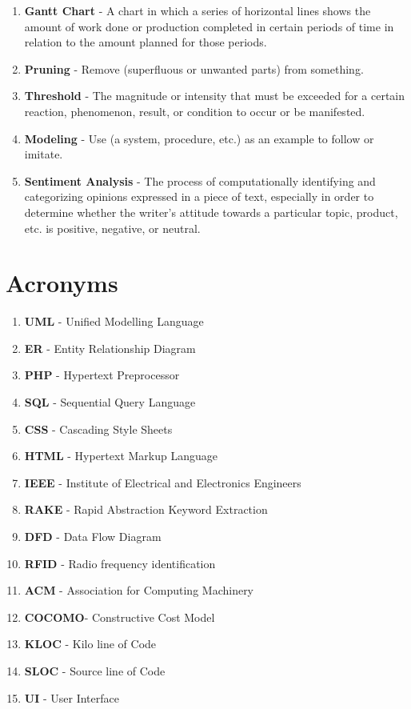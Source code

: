 \documentclass[a4paper,12pt]{report}
\begin{document}
\begin{enumerate}
  \item \textbf{Gantt Chart} - A chart in which a series of horizontal lines shows the amount of work done or production completed in certain periods of time in relation to the amount planned for those periods.
  \item \textbf{Pruning} - Remove (superfluous or unwanted parts) from something.
  \item \textbf{Threshold} - The magnitude or intensity that must be exceeded for a certain reaction, phenomenon, result, or condition to occur or be manifested.
  \item \textbf{Modeling} - Use (a system, procedure, etc.) as an example to follow or imitate.
  \item \textbf{Sentiment Analysis} - The process of computationally identifying and categorizing opinions expressed in a piece of text, especially in order to determine whether the writer's attitude towards a particular topic, product, etc. is positive, negative, or neutral.
\end{enumerate}

\section{Acronyms}
\begin{enumerate}
  \item \textbf{UML}  - Unified Modelling Language
  \item \textbf{ER}   - Entity Relationship Diagram
  \item \textbf{PHP}  - Hypertext Preprocessor
  \item \textbf{SQL}  - Sequential Query Language
  \item \textbf{CSS}  - Cascading Style Sheets
  \item \textbf{HTML} - Hypertext Markup Language
  \item \textbf{IEEE} - Institute of Electrical and Electronics Engineers
  \item \textbf{RAKE} - Rapid Abstraction Keyword Extraction
  \item \textbf{DFD}  - Data Flow Diagram
  \item \textbf{RFID} - Radio frequency identification
  \item \textbf{ACM}  - Association for Computing Machinery
  \item\textbf{COCOMO}- Constructive Cost Model
  \item \textbf{KLOC} - Kilo line of Code
  \item \textbf{SLOC} - Source line of Code
  \item \textbf{UI}   - User Interface
\end{enumerate}
\end{document}
